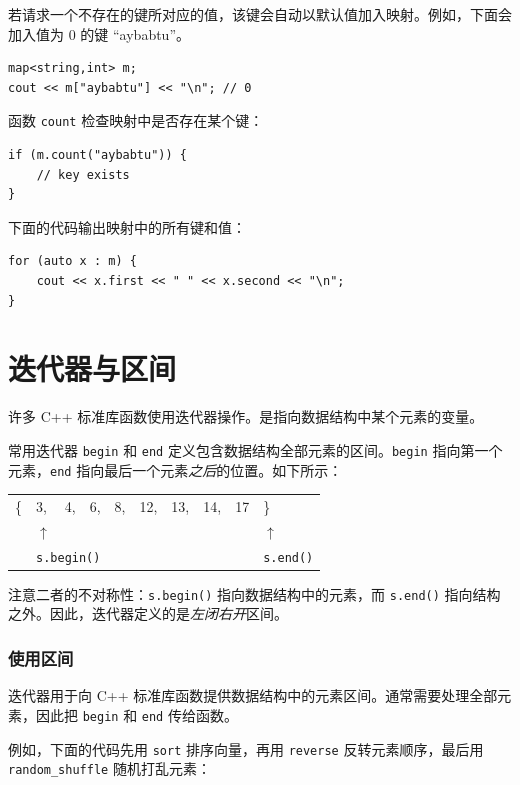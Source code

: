若请求一个不存在的键所对应的值，该键会自动以默认值加入映射。例如，下面会加入值为 0 的键 ``aybabtu''。

\begin{lstlisting}
map<string,int> m;
cout << m["aybabtu"] << "\n"; // 0
\end{lstlisting}
函数 \texttt{count} 检查映射中是否存在某个键：
\begin{lstlisting}
if (m.count("aybabtu")) {
    // key exists
}
\end{lstlisting}
下面的代码输出映射中的所有键和值：
\begin{lstlisting}
for (auto x : m) {
    cout << x.first << " " << x.second << "\n";
}
\end{lstlisting}

\section{迭代器与区间}


许多 C++ 标准库函数使用迭代器操作。是指向数据结构中某个元素的变量。

常用迭代器 \texttt{begin} 和 \texttt{end} 定义包含数据结构全部元素的区间。\texttt{begin} 指向第一个元素，\texttt{end} 指向最后一个元素\emph{之后}的位置。如下所示：

\begin{center}
\begin{tabular}{llllllllll}
\{ & 3, & 4, & 6, & 8, & 12, & 13, & 14, & 17 & \} \\
& $\uparrow$ & & & & & & & & $\uparrow$ \\
& \multicolumn{3}{l}{\texttt{s.begin()}} & & & & & & \texttt{s.end()} \\
\end{tabular}
\end{center}

注意二者的不对称性：\texttt{s.begin()} 指向数据结构中的元素，而 \texttt{s.end()} 指向结构之外。因此，迭代器定义的是\emph{左闭右开}区间。

\subsubsection{使用区间}

迭代器用于向 C++ 标准库函数提供数据结构中的元素区间。通常需要处理全部元素，因此把 \texttt{begin} 和 \texttt{end} 传给函数。

例如，下面的代码先用 \texttt{sort} 排序向量，再用 \texttt{reverse} 反转元素顺序，最后用 \texttt{random\_shuffle} 随机打乱元素：

